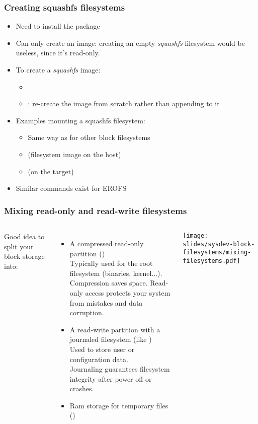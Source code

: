 \begin{frame}
  \frametitle{Creating squashfs filesystems}
  \begin{itemize}
  \item Need to install the  package
  \item Can only create an image: creating an empty {\em squashfs}
    filesystem would be useless, since it's read-only.
  \item To create a {\em squashfs} image:
    \begin{itemize}
    \item {}
    \item {}: re-create the image from scratch rather
      than appending to it
    \end{itemize}
  \item Examples mounting a squashfs filesystem:
    \begin{itemize}
    \item Same way as for other block filesystems
    \item {} (filesystem image on the host)
    \item {} (on the target)
    \end{itemize}
  \item Similar commands exist for EROFS
  \end{itemize}
\end{frame}

\begin{frame}
  \frametitle{Mixing read-only and read-write filesystems}
  \begin{columns}[T]
    Good idea to split your block storage into:
    \begin{itemize}
    \item A compressed read-only partition ()\\
      Typically used for the root filesystem (binaries, kernel...).\\
      Compression saves space. Read-only access protects your system
      from mistakes and data corruption.
    \item A read-write partition with a journaled filesystem (like )\\
      Used to store user or configuration data.\\
      Journaling guarantees filesystem integrity after power off or crashes.
    \item Ram storage for temporary files ()
    \end{itemize}
    \texttt{[image: slides/sysdev-block-filesystems/mixing-filesystems.pdf]}
  \end{columns}
\end{frame}

